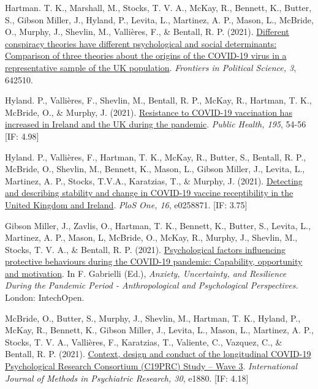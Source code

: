 \documentclass[12pt]{article}
\begin{document}
\begin{bibenum}
\item Hartman. T. K., Marshall, M., 
		Stocks, T. V. A., McKay, R., 
		Bennett, K., Butter, S., Gibson Miller, J., 
		Hyland, P., Levita, L., Martinez, A. P., 
		Mason, L., McBride, O., Murphy, J., 
		Shevlin, M., Vallières, F., 
		\& Bentall, R. P.  (2021). 
		\href{https://doi.org/10.3389/fpos.2021.642510}
		{Different conspiracy theories have 
		different psychological and social 
		determinants: Comparison of three 
		theories about the origins of the 
		COVID-19 virus in a representative 
		sample of the UK population}.
		\emph{Frontiers in Political Science, 3}, 
		642510.
	
\item Hyland. P., Vallières, F., Shevlin, M.,  
	Bentall, R. P., McKay, R., Hartman, T. K., 
	McBride, O., \& Murphy, J. (2021). 
	\href{https://doi.org/10.1016/j.puhe.2021.04.009}
	{Resistance to COVID-19 vaccination has increased 
	in Ireland and the UK during the pandemic}. 
	\emph{Public Health, 195}, 54-56 [IF: 4.98]

\item Hyland. P., Vallières, F., 
		Hartman, T. K., McKay, R., 
		Butter, S., Bentall, R. P., McBride, O., 
		Shevlin, M., Bennett, K., 
		Mason, L., Gibson Miller, J., 
		Levita, L., Martinez, A. P., 
		Stocks, T.V.A., Karatzias, T., 
		\& Murphy, J. (2021). 
		\href{https://doi.org/10.1371/journal.pone.0258871}
		{Detecting and describing stability and 
		change in COVID-19 vaccine receptibility 
		in the United Kingdom and Ireland}. 
		\emph{PloS One, 16}, e0258871. 
		[IF: 3.75]
	
\item Gibson Miller, J., Zavlis, O., Hartman, T. K., 
	Bennett, K., Butter, S., Levita, L., 
	Martinez, A. P., Mason, L, McBride, O., 
	McKay, R., Murphy, J., Shevlin, M., 
	Stocks, T. V. A., \& Bentall, R. P. (2021). 
	\href{https://doi.org/10.5772/intechopen.98237}
	{Psychological factors influencing protective 
	behaviours during the COVID-19 pandemic: 
	Capability, opportunity and motivation}. 
	In F. Gabrielli (Ed.), \textit{Anxiety, 
	Uncertainty, and Resilience During the 
	Pandemic Period - Anthropological and Psychological 
	Perspectives.} London: IntechOpen.
	
\item McBride, O., Butter, S., Murphy, J., 
	Shevlin, M., Hartman, T. K., Hyland, P., 
	McKay, R., Bennett, K., Gibson Miller, J.,  
	Levita, L., Mason, L., Martinez, A. P.,  
	Stocks, T. V. A., Vallières, F., Karatzias, T., 
	Valiente, C., Vazquez, C., \& Bentall, R. P. (2021). 
	\href{https://doi.org/10.1002/mpr.1880}
	{Context, design and conduct of the 
	longitudinal COVID-19 Psychological 
	Research Consortium (C19PRC) Study – Wave 3}.  
	\emph{International Journal of Methods in 
	Psychiatric Research, 30}, e1880. [IF: 4.18]
		

\end{bibenum}
\end{document}
